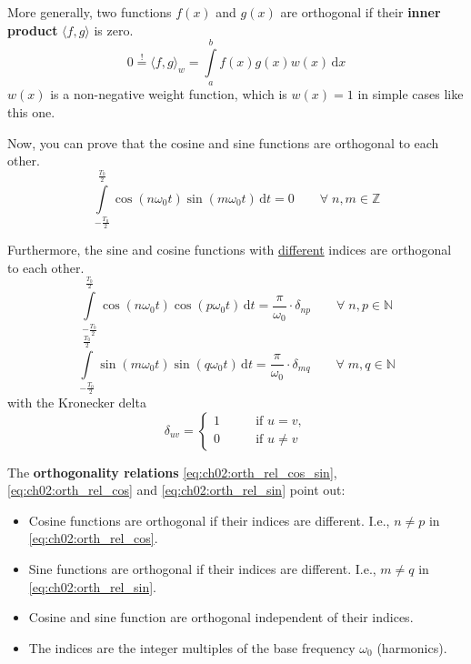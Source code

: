 \begin{refsection}
More generally, two functions $f(x)$ and $g(x)$ are orthogonal if their  \textbf{inner product} $\langle f, g \rangle$ is zero. 
\begin{equation}
	0 \stackrel{!}{=} \langle f, g \rangle_w = \int\limits_{a}^{b} f(x) g(x) w(x) \, \mathrm{d} x
\end{equation}
$w(x)$ is a non-negative weight function, which is $w(x) = 1$ in simple cases like this one.

Now, you can prove that the cosine and sine functions are orthogonal to each other.
\begin{equation}
	\int\limits_{-\frac{T_0}{2}}^{\frac{T_0}{2}} \cos\left(n \omega_0 t\right) \sin\left(m \omega_0 t\right) \, \mathrm{d} t = 0 \qquad \forall \; n, m \in \mathbb{Z}
	\label{eq:ch02:orth_rel_cos_sin}
\end{equation}

Furthermore, the sine and cosine functions with \underline{different} indices are orthogonal to each other.
\begin{equation}
	\int\limits_{-\frac{T_0}{2}}^{\frac{T_0}{2}} \cos\left(n \omega_0 t\right) \cos\left(p \omega_0 t\right) \, \mathrm{d} t = \frac{\pi}{\omega_0} \cdot \delta_{np} \qquad \forall \; n, p \in \mathbb{N}
	\label{eq:ch02:orth_rel_cos}
\end{equation}
\begin{equation}
	\int\limits_{-\frac{T_0}{2}}^{\frac{T_0}{2}} \sin\left(m \omega_0 t\right) \sin\left(q \omega_0 t\right) \, \mathrm{d} t = \frac{\pi}{\omega_0} \cdot \delta_{mq} \qquad \forall \; m, q \in \mathbb{N}
	\label{eq:ch02:orth_rel_sin}
\end{equation}
with the Kronecker delta
\begin{equation}
	\delta_{uv} = \begin{cases}
		1 & \qquad \text{if } u = v, \\
		0 & \qquad \text{if } u \neq v
	\end{cases}
	\label{eq:ch02:kronecker_delta}
\end{equation}

The  \textbf{orthogonality relations} \eqref{eq:ch02:orth_rel_cos_sin}, \eqref{eq:ch02:orth_rel_cos} and \eqref{eq:ch02:orth_rel_sin} point out:
\begin{itemize}
	\item Cosine functions are orthogonal if their indices are different. I.e., $n \neq p$ in \eqref{eq:ch02:orth_rel_cos}.
	\item Sine functions are orthogonal if their indices are different. I.e., $m \neq q$ in \eqref{eq:ch02:orth_rel_sin}.
	\item Cosine and sine function are orthogonal independent of their indices.
	\item The indices are the integer multiples of the base frequency $\omega_0$ (harmonics).
\end{itemize}


\end{refsection}
